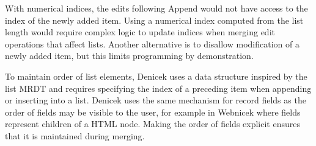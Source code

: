 \documentclass[sigconf,anonymous,screen]{acmart}
\newcommand{\ident}[1]{{\sffamily #1}}
\newcommand{\note}[1]{\textcolor{red}{#1}}
\begin{document}
With numerical indices, the edits following \ident{Append} would not have access to the index of
the newly added item. Using a numerical index computed from the list length would require
complex logic to update indices when merging edit operations that affect lists. Another alternative
is to disallow modification of a newly added item, but this limits programming by demonstration.

%
%

To maintain order of list elements, Denicek uses a data structure inspired by the list MRDT
\cite{kaki-2019-mrdts} and requires specifying the index of a preceding item when appending
or inserting into a list. Denicek uses the same mechanism for record fields as the order of fields
may be visible to the user, for example in Webnicek where fields represent children of a HTML node.
Making the order of fields explicit ensures that it is maintained during merging.
\end{document}
